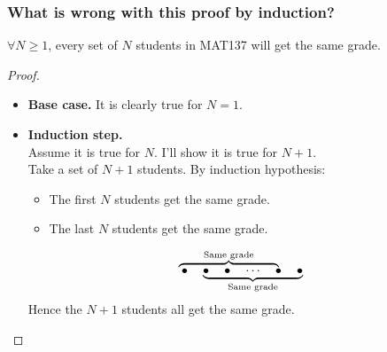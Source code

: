 \documentclass[14pt]{beamer}
\begin{document}
	\begin{frame}
		\frametitle{What is wrong with this proof by induction?}
		\fontsize{13}{13}\selectfont

		\vspace{-1.5mm}
		\begin{theorem}
			$\forall N \geq 1$, every set of $N$ students in MAT137 will get the same
			grade.
		\end{theorem}
		\vspace{-1mm}

		\begin{proof}
			\begin{itemize}
				\item {\bfseries Base case.} It is clearly true for $N=1$.

				\item {\bfseries Induction step.} \\ Assume it is true for $N$. I'll
					show it is true for $N+1$. \\ Take a set of $N+1$ students. By
					induction hypothesis:
					\begin{itemize}
						\item The first $N$ students get the same grade.

						\item The last $N$ students get the same grade.
					\end{itemize}
					\[
						\mathrlap{\overbrace{\phantom{\bullet \quad \bullet \quad \cdots
						\quad \bullet \quad \bullet }}^{\text{Same grade}}}\bullet \quad \underbrace{\bullet
						\quad \bullet \quad \cdots \quad \bullet \quad \bullet}_{\text{Same
						grade}}
					\]
					Hence the $N+1$ students all get the same grade.
			\end{itemize}
		\end{proof}
	\end{frame}
\end{document}

